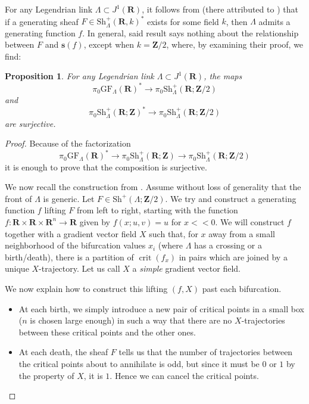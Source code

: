 \documentclass[12pt,a4paper]{article}
\numberwithin{equation}{section}
\newtheorem{prop}[equation]{Proposition}
\theoremstyle{definition}
\theoremstyle{remark}
\newcommand{\Z}{\mathbf{Z}}
\newcommand{\R}{\mathbf{R}}
\newcommand{\s}{\mathbf{s}}
\newcommand{\Sh}{\mathrm{Sh}}
\DeclareMathOperator{\crit}{crit}
\newcommand{\GF}{\mathrm{GF}}
\begin{document}
For any Legendrian link $\Lambda \subset J^1(\R)$,  it follows from \cite[Thm. C]{Fuchs-Rutherford} (there attributed to \cite{chekanov-pushkar-combinatorics}) that if a generating sheaf $F \in \Sh^+_\Lambda(\R,k)^*$ exists for some field $k$, then $\Lambda$ admits a generating function $f$.  In general, said result says nothing about the relationship between $F$ and $\s(f)$, except when $k=\Z/2$, where, by examining their proof, we find:

\begin{prop}\label{prop:mod2lift}
For any Legendrian link $\Lambda \subset J^1(\R)$, the maps
\[\pi_0 \GF_\Lambda(\R)^* \to \pi_0 \Sh^+_\Lambda(\R;\Z/2)\]
and
\[\pi_0 \Sh^+_\Lambda(\R;\Z)^* \to \pi_0\Sh^+_{\Lambda}(\R;\Z/2)\]
are surjective.
\end{prop}

\begin{proof}
Because of the factorization
\[\pi_0 \GF_\Lambda(\R)^* \to \pi_0 \Sh^+_\Lambda(\R;\Z) \to \pi_0 \Sh^+_\Lambda(\R;\Z/2)\]
it is enough to prove that the composition is surjective.

We now recall the construction from \cite{Fuchs-Rutherford}.
Assume without loss of generality that the front of $\Lambda$ is generic. Let $F\in \Sh^+(\Lambda;\Z/2)$.
We try and construct a generating function $f$ lifting $F$ from left to right, starting with the function
$f:\R\times \R\times \R^n\to \R$ given by $f(x;u,v)=u$ for $x<<0$. We will construct $f$ together with a gradient vector
field $X$ such that, for $x$ away from a small neighborhood of the bifurcation values $x_i$ (where $\Lambda$ has a crossing or a birth/death),
there is a partition of $\crit(f_x)$ in pairs which are joined by a unique $X$-trajectory. Let us call
$X$ a \emph{simple} gradient vector field.

We now explain how to construct this lifting $(f,X)$ past each bifurcation.
\begin{itemize}
\item At each birth, we simply introduce a new pair of critical points in a small box ($n$ is chosen large enough)
in such a way that there are no $X$-trajectories between these critical points and the other ones.

\item At each death, the sheaf $F$ tells us that the number of trajectories between the critical
points about to annihilate is odd, but since it must be $0$ or $1$ by the property of $X$, it is $1$.
Hence we can cancel the critical points.


\end{itemize}
\end{proof}
\end{document}
